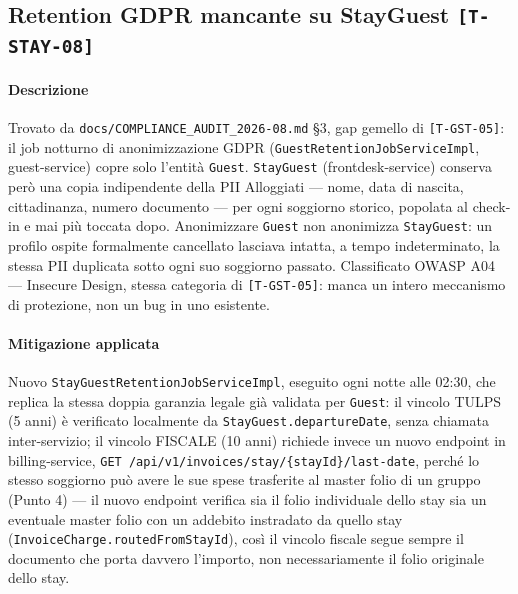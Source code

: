 ﻿\documentclass[a4paper,12pt]{report}
\newcommand{\threat}[1]{\texttt{\small\textcolor{vulnred}{[#1]}}}
\begin{document}
\subsection{Retention GDPR mancante su StayGuest \threat{T-STAY-08}}

\paragraph{Descrizione}
Trovato da \texttt{docs/COMPLIANCE\_AUDIT\_2026-08.md} \S3, gap gemello di
\threat{T-GST-05}: il job notturno di anonimizzazione GDPR
(\texttt{GuestRetentionJobServiceImpl}, guest-service) copre solo l'entità
\texttt{Guest}. \texttt{StayGuest} (frontdesk-service) conserva però una
copia indipendente della PII Alloggiati --- nome, data di nascita,
cittadinanza, numero documento --- per ogni soggiorno storico, popolata al
check-in e mai più toccata dopo. Anonimizzare \texttt{Guest} non anonimizza
\texttt{StayGuest}: un profilo ospite formalmente cancellato lasciava
intatta, a tempo indeterminato, la stessa PII duplicata sotto ogni suo
soggiorno passato. Classificato OWASP A04 --- Insecure Design, stessa
categoria di \threat{T-GST-05}: manca un intero meccanismo di protezione,
non un bug in uno esistente.

\paragraph{Mitigazione applicata}
Nuovo \texttt{StayGuestRetentionJobServiceImpl}, eseguito ogni notte alle
02:30, che replica la stessa doppia garanzia legale già validata per
\texttt{Guest}: il vincolo TULPS (5 anni) è verificato localmente da
\texttt{StayGuest.departureDate}, senza chiamata inter-servizio; il vincolo
FISCALE (10 anni) richiede invece un nuovo endpoint in billing-service,
\texttt{GET /api/v1/invoices/stay/\{stayId\}/last-date}, perché lo stesso
soggiorno può avere le sue spese trasferite al master folio di un gruppo
(Punto 4) --- il nuovo endpoint verifica sia il folio individuale dello stay
sia un eventuale master folio con un addebito instradato da quello stay
(\texttt{InvoiceCharge.routedFromStayId}), così il vincolo fiscale segue
sempre il documento che porta davvero l'importo, non necessariamente il
folio originale dello stay.
\end{document}
